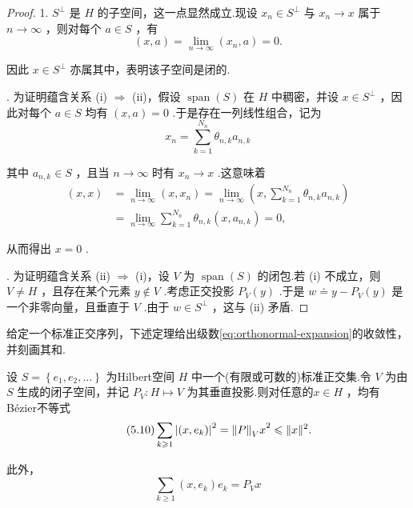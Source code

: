 \begin{proof}
1. ${S}^{ \bot  }$ 是 $H$ 的子空间，这一点显然成立.现设 ${x}_{n} \in  {S}^{ \bot  }$ 与 ${x}_{n} \rightarrow  x$ 属于 $n \rightarrow  \infty$ ，则对每个 $a \in  S$ ，有
\[
\left( {x,a}\right)  = \mathop{\lim }\limits_{{n \rightarrow  \infty }}\left( {{x}_{n},a}\right)  = 0.
\]

因此 $x \in  {S}^{ \bot  }$ 亦属其中，表明该子空间是闭的.

. 为证明蕴含关系 (i) $\Rightarrow$ (ii)，假设 $\operatorname{span}\left( S\right)$ 在 $H$ 中稠密，并设 $x \in  {S}^{ \bot  }$ ，因此对每个 $a \in  S$ 均有 $\left( {x,a}\right)  = 0$ .于是存在一列线性组合，记为
\[
{x}_{n} = \sum\limits_{{k = 1}}^{{N}_{n}}{\theta }_{n,k}{a}_{n,k}
\]

其中 ${a}_{n,k} \in  S$ ，且当 $n \rightarrow  \infty$ 时有 ${x}_{n} \rightarrow  x$ .这意味着
{\begin{align*}
    \left( {x,x}\right)  &= \lim_{{n \rightarrow  \infty }}\left( {x,{x}_{n}}\right)  = \lim_{{n \rightarrow  \infty }}\left( {x,\sum_{{k = 1}}^{{N}_{n}}{\theta }_{n,k}{a}_{n,k}}\right)\\
    &=\lim_{n \rightarrow  \infty }\sum_{{k = 1}}^{{N}_{n}}{\theta }_{n,k}\left( {x,{a}_{n,k}}\right)  = 0,
\end{align*}}

从而得出 $x = 0$ .

. 为证明蕴含关系 (ii) $\Rightarrow$ (i)，设 $V$ 为 $\operatorname{span}\left( S\right)$ 的闭包.若 (i) 不成立，则 $V \neq  H$ ，且存在某个元素 $y \notin  V$ .考虑正交投影 ${P}_{V}\left( y\right)$ .于是 $w \doteq  y - {P}_{V}\left( y\right)$ 是一个非零向量，且垂直于 $V$ .由于 $w \in  {S}^{ \bot  }$ ，这与 (ii) 矛盾.
\end{proof}

给定一个标准正交序列，下述定理给出级数\eqref{eq:orthonormal-expansion}的收敛性，并刻画其和.

\begin{theorem}[正交级数的和]\label{thm:orthogonal-series-sum}
设 $S = \left\{  {{e}_{1},{e}_{2},\ldots }\right\}$ 为Hilbert空间 $H$ 中一个(有限或可数的)标准正交集.令 $V$ 为由 $S$ 生成的闭子空间，并记 ${P}_{V} : H \mapsto  V$ 为其垂直投影.则对任意的$x \in  H$ ，均有Bézier不等式
\begin{equation}\tag{5.10}\label{eq:bessel-inequality}
\sum\limits_{{k \geqslant  1}}{\left| \left( x,{e}_{k}\right) \right| }^{2} = {\norm{P}_{V}x}^{2} \leqslant  \| x{\| }^{2}.
\end{equation}

此外，
\begin{equation}\tag{5.11}\label{eq:orthogonal-series-sum}
\sum\limits_{{k \geq  1}}\left( {x,{e}_{k}}\right) {e}_{k} = {P}_{V}x
\end{equation}

\end{theorem}

